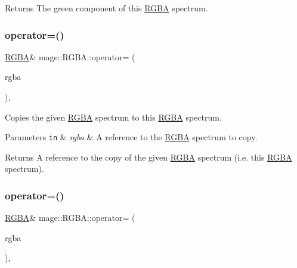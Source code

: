 \begin{DoxyReturn}{Returns}
The green component of this \mbox{\hyperlink{structmage_1_1_r_g_b_a}{R\+G\+BA}} spectrum. 
\end{DoxyReturn}
\mbox{\label{structmage_1_1_r_g_b_a_a96b9f7d1b17cc68b8b0949eefe3d3e5c}} 
\subsubsection{\texorpdfstring{operator=()}{operator=()}\hspace{0.1cm}{\footnotesize\ttfamily [1/2]}}
{\footnotesize\ttfamily \mbox{\hyperlink{structmage_1_1_r_g_b_a}{R\+G\+BA}}\& mage\+::\+R\+G\+B\+A\+::operator= (\begin{DoxyParamCaption}\item[{const \mbox{\hyperlink{structmage_1_1_r_g_b_a}{R\+G\+BA}} \&}]{rgba }\end{DoxyParamCaption})\hspace{0.3cm}{\ttfamily [default]}, {\ttfamily [noexcept]}}

Copies the given \mbox{\hyperlink{structmage_1_1_r_g_b_a}{R\+G\+BA}} spectrum to this \mbox{\hyperlink{structmage_1_1_r_g_b_a}{R\+G\+BA}} spectrum.


\begin{DoxyParams}[1]{Parameters}
\mbox{\tt in}  & {\em rgba} & A reference to the \mbox{\hyperlink{structmage_1_1_r_g_b_a}{R\+G\+BA}} spectrum to copy. \\
\hline
\end{DoxyParams}
\begin{DoxyReturn}{Returns}
A reference to the copy of the given \mbox{\hyperlink{structmage_1_1_r_g_b_a}{R\+G\+BA}} spectrum (i.\+e. this \mbox{\hyperlink{structmage_1_1_r_g_b_a}{R\+G\+BA}} spectrum). 
\end{DoxyReturn}
\mbox{\label{structmage_1_1_r_g_b_a_afcac58d6a76659c2a5821b8c957fc90e}} 
\subsubsection{\texorpdfstring{operator=()}{operator=()}\hspace{0.1cm}{\footnotesize\ttfamily [2/2]}}
{\footnotesize\ttfamily \mbox{\hyperlink{structmage_1_1_r_g_b_a}{R\+G\+BA}}\& mage\+::\+R\+G\+B\+A\+::operator= (\begin{DoxyParamCaption}\item[{\mbox{\hyperlink{structmage_1_1_r_g_b_a}{R\+G\+BA}} \&\&}]{rgba }\end{DoxyParamCaption})\hspace{0.3cm}{\ttfamily [default]}, {\ttfamily [noexcept]}}

